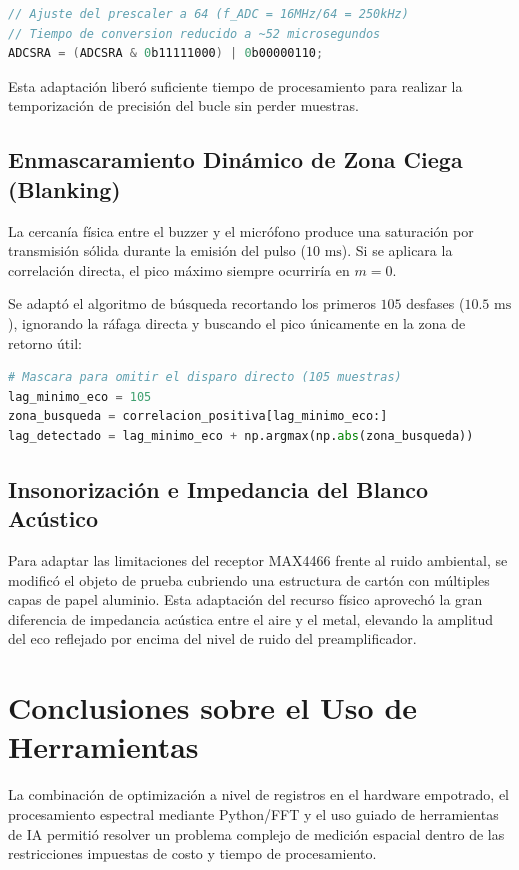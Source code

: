 \documentclass[conference]{IEEEtran}
\begin{document}
\begin{lstlisting}[language=C, caption={Adaptación a nivel de registros del ADC AVR.}]
// Ajuste del prescaler a 64 (f_ADC = 16MHz/64 = 250kHz)
// Tiempo de conversion reducido a ~52 microsegundos
ADCSRA = (ADCSRA & 0b11111000) | 0b00000110;
\end{lstlisting}

Esta adaptación liberó suficiente tiempo de procesamiento para realizar la temporización de precisión del bucle sin perder muestras.

\subsection{Enmascaramiento Dinámico de Zona Ciega (Blanking)}
La cercanía física entre el buzzer y el micrófono produce una saturación por transmisión sólida durante la emisión del pulso ($10\text{ ms}$). Si se aplicara la correlación directa, el pico máximo siempre ocurriría en $m = 0$. 

Se adaptó el algoritmo de búsqueda recortando los primeros $105$ desfases ($10.5\text{ ms}$), ignorando la ráfaga directa y buscando el pico únicamente en la zona de retorno útil:

\begin{lstlisting}[language=Python, caption={Adaptación del algoritmo de correlación en Python.}]
# Mascara para omitir el disparo directo (105 muestras)
lag_minimo_eco = 105               
zona_busqueda = correlacion_positiva[lag_minimo_eco:]
lag_detectado = lag_minimo_eco + np.argmax(np.abs(zona_busqueda))
\end{lstlisting}

\subsection{Insonorización e Impedancia del Blanco Acústico}
Para adaptar las limitaciones del receptor MAX4466 frente al ruido ambiental, se modificó el objeto de prueba cubriendo una estructura de cartón con múltiples capas de papel aluminio. Esta adaptación del recurso físico aprovechó la gran diferencia de impedancia acústica entre el aire y el metal, elevando la amplitud del eco reflejado por encima del nivel de ruido del preamplificador.

\section{Conclusiones sobre el Uso de Herramientas}
La combinación de optimización a nivel de registros en el hardware empotrado, el procesamiento espectral mediante Python/FFT y el uso guiado de herramientas de IA permitió resolver un problema complejo de medición espacial dentro de las restricciones impuestas de costo y tiempo de procesamiento.
\end{document}
